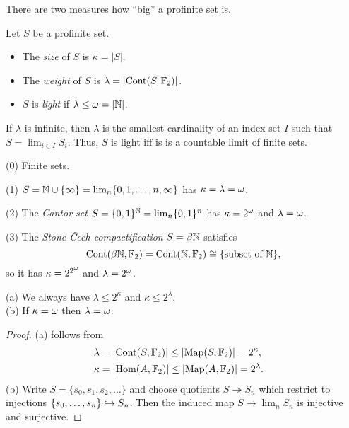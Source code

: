 \documentclass{notes}
\begin{document}
There are two measures how ``big'' a profinite set is.

\begin{defi}
Let $S$ be a profinite set. 
\begin{itemize}
\item The {\em size} of $S$ is $\kappa=|S|$.
\item The {\em weight} of $S$ is $\lambda=|{\rm Cont}(S,{\mathbb{F}}_2)|$.
\item $S$ is {\em light} if $\lambda\leq{\omega}=|{\mathbb{N}}|$.
\end{itemize}
\end{defi}

\begin{rem}
If $\lambda$ is infinite, then $\lambda$ is the smallest
  cardinality of an index set $I$ such that $S=\lim_{i\in I}S_i$.
Thus, $S$ is light iff is is a countable limit of finite sets.
\end{rem}

\begin{example}
(0) Finite sets.
  
(1) $S = {\mathbb{N}}\cup\{\infty\} = \lim_n\{0,1,\dots,n,\infty\}$ has $\kappa=\lambda={\omega}$. 

(2) The {\em Cantor set} $S = \{0,1\}^{\mathbb{N}} = \lim_n\{0,1\}^n$ has
  $\kappa=2^{\omega}$ and $\lambda={\omega}$.

(3) The {\em Stone-\v{C}ech compactification} $S=\beta{\mathbb{N}}$ satisfies 
$$
  {\rm Cont}(\beta{\mathbb{N}},{\mathbb{F}}_2) = {\rm Cont}({\mathbb{N}},{\mathbb{F}}_2) \cong \{\text{subset of }{\mathbb{N}}\},
$$
so it has $\kappa=2^{2^{\omega}}$ and $\lambda=2^{\omega}$. 
\end{example}

\begin{prop}
(a) We always have $\lambda\leq 2^\kappa$ and $\kappa\leq 2^\lambda$. \\
(b) If $\kappa={\omega}$ then $\lambda={\omega}$. 
\end{prop}

\begin{proof}
(a) follows from
\begin{align*}
  \lambda &= |{\rm Cont}(S,{\mathbb{F}}_2)| \leq |{\rm Map}(S,{\mathbb{F}}_2)| = 2^\kappa, \cr
  \kappa &= |\mathrm{Hom}(A,{\mathbb{F}}_2)| \leq |{\rm Map}(A,{\mathbb{F}}_2)| = 2^\lambda.
\end{align*}
(b) Write $S=\{s_0,s_1,s_2,\dots\}$ and choose quotients
$S\twoheadrightarrow S_n$ which restrict to injections
$\{s_0,\dots,s_n\}\hookrightarrow S_n$. Then the induced map $S\to\lim_n S_n$ is
injective and surjective.
\end{proof}
\end{document}
